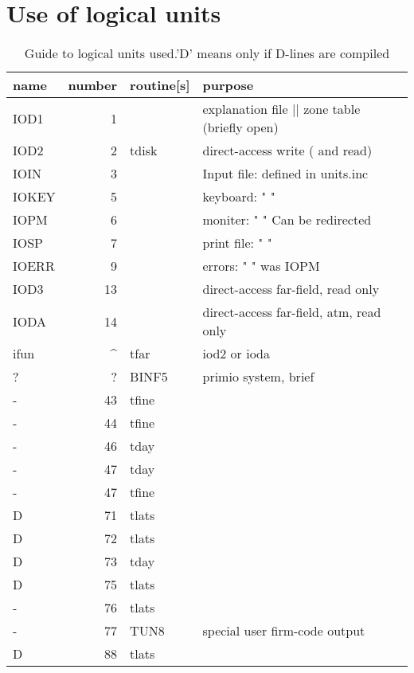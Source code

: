 \documentclass{article}
\begin{document}
\section{Use of logical units} %

\begin{table} 
\caption[Logical units]{Guide to logical units used.'D' means only if D-lines are compiled }
\label{lunit.tab}
\begin{center} \begin{tabular}{ | l r l l | } \hline
name  & number &  routine[s] &  purpose \\ \hline
IOD1  & 1    &       & explanation file ||  zone table (briefly open) \\
IOD2  & 2    & tdisk & direct-access write ( and read) \\
IOIN  & 3    &       & Input file: defined in units.inc \\
IOKEY & 5    &       & keyboard:     " " \\ 
IOPM  & 6    &       & moniter:      " " Can be redirected \\
IOSP  & 7    &       & print file:   " " \\
IOERR & 9    &       & errors:       " " was IOPM \\
IOD3  & 13   &       & direct-access far-field, read only \\
IODA  & 14   &       & direct-access far-field, atm, read only \\
ifun & \^{ } &  tfar & iod2 or ioda  \\
? &  ? & BINF5 &  primio system, brief \\
- & 43 & tfine & \\
- & 44 & tfine & \\
- & 46 & tday  & \\
- & 47 & tday  & \\
- & 47 & tfine & \\
D & 71 & tlats & \\
D & 72 & tlats & \\
D & 73 & tday  & \\
D & 75 & tlats & \\
- & 76 & tlats & \\
- & 77 & TUN8  & special user firm-code output \\
D & 88 & tlats & \\  \hline
\end{tabular} \end{center} \end{table}
\end{document}
